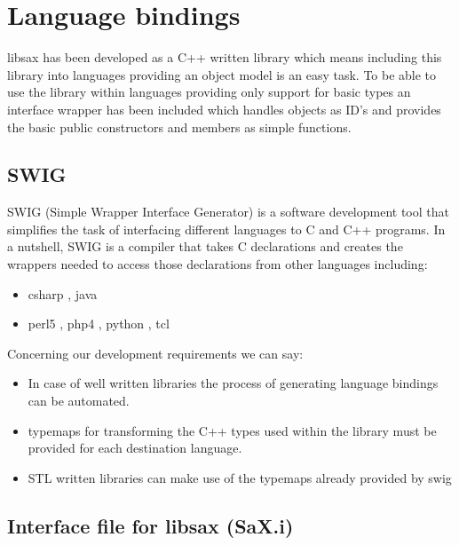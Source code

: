 \chapter{Language bindings}
\minitoc

libsax has been developed as a C++ written library which means
including this library into languages providing an object model
is an easy task. To be able to use the library within languages
providing only support for basic types an interface wrapper has
been included which handles objects as ID's and provides the basic
public constructors and members as simple functions.

\section{SWIG}

SWIG (Simple Wrapper Interface Generator) is a software development tool
that simplifies the task of
interfacing different languages to C and C++ programs. In a nutshell,
SWIG is a compiler that takes C declarations and creates the wrappers
needed to access those declarations from other languages
including:

\begin{itemize}
\item csharp , java
\item perl5 , php4 , python , tcl
\end{itemize}

Concerning our development requirements we can say:

\begin{itemize}
\item In case of well written libraries the process of generating
      language bindings can be automated.
\item typemaps for transforming the C++ types used within the library
      must be provided for each destination language.
\item STL written libraries can make use of the typemaps already
      provided by swig
\end{itemize}

\newpage

\section{Interface file for libsax (SaX.i)}

